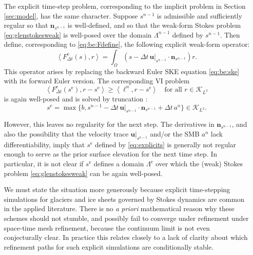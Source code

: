 \documentclass[hidelinks,onefignum,onetabnum,final]{siamart220329}  %
\newcommand{\bn}{\mathbf{n}}
\newcommand{\bu}{\mathbf{u}}
\newcommand{\cK}{\mathcal{K}}
\newcommand{\ip}[2]{\left<#1,#2\right>}
\begin{document}
The explicit time-step problem, corresponding to the implicit problem in Section \ref{sec:model}, has the same character.  Suppose $s^{n-1}$ is admissible and sufficiently regular so that $\bn_{s^{n-1}}$ is well-defined, and so that the weak-form Stokes problem \eqref{eq:glenstokesweak} is well-posed over the domain $\Lambda^{n-1}$ defined by $s^{n-1}$.  Then define, corresponding to \eqref{eq:be:Fdefine}, the following explicit weak-form operator:
\begin{equation}
\ip{F^{\text{e}}_{\Delta t}(s)}{r} = \int_\Omega \left(s - \Delta t\, \bu|_{s^{n-1}} \cdot \bn_{s^{n-1}}\right) r.  \label{eq:explicitFdefine}
\end{equation}
This operator arises by replacing the backward Euler SKE equation \eqref{eq:be:ske} with its forward Euler version.  The corresponding VI problem
\begin{equation}
\ip{F^{\text{e}}_{\Delta t}(s^{\text{e}})}{r-s^{\text{e}}} \ge \ip{\ell^n}{r-s^{\text{e}}} \quad \text{for all } r \in \cK_{L^2}
\end{equation}
is again well-posed and is solved by truncation \cite[section II.3]{KinderlehrerStampacchia1980}:
\begin{equation}
s^{\text{e}} = \max\{b, s^{n-1} - \Delta t\, \bu|_{s^{n-1}} \cdot \bn_{s^{n-1}} + \Delta t\,a^n\} \in \cK_{L^2}. \label{eq:explicits}
\end{equation}

However, this leaves no regularity for the next step.  The derivatives in $\bn_{s^{n-1}}$, and also the possibility that the velocity trace $\bu|_{s^{n-1}}$ and/or the SMB $a^n$ lack differentiability, imply that $s^{\text{e}}$ defined by \eqref{eq:explicits} is generally not regular enough to serve as the prior surface elevation for the next time step.  In particular, it is not clear if $s^{\text{e}}$ defines a domain $\Lambda^{\text{e}}$ over which the (weak) Stokes problem \eqref{eq:glenstokesweak} can be again well-posed.

We must state the situation more generously because explicit time-stepping simulations for glaciers and ice sheets governed by Stokes dynamics are common in the applied literature.  There is no \emph{a priori} mathematical reason why these schemes should not stumble, and possibly fail to converge under refinement under space-time mesh refinement, because the continuum limit is not even conjecturally clear.  In practice this relates closely to a lack of clarity about which refinement paths for such explicit simulations are conditionally stable.
\end{document}
